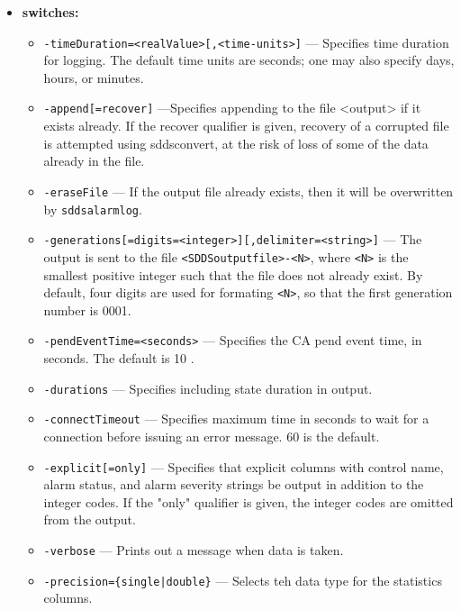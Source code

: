 \begin{itemize}
%
\item {\bf switches:}
%
%
    \begin{itemize}
%
%
        \item {\tt -timeDuration=<realValue>[,<time-units>]} ---  Specifies time duration for logging.
                The default time units are seconds; one may also specify days, hours, or minutes.
        \item {\tt -append[=recover]} ---Specifies appending to the file <output> if it exists already.
                If the recover qualifier is given, recovery of a corrupted file
                is attempted using sddsconvert, at the risk of loss of some of the
                data already in the file.
        \item {\tt -eraseFile} --- If the output file already exists, then it will be overwritten
                by \verb+sddsalarmlog+.
        \item {\verb+-generations[=digits=<integer>][,delimiter=<string>]+} ---
                The output is sent to the file \verb+<SDDSoutputfile>-<N>+, where \verb+<N>+ is
                   the smallest positive integer such that the file does not already
                   exist.   By default, four digits are used for formating \verb+<N>+, so that
                   the first generation number is 0001.
        \item {\tt -pendEventTime=<seconds>} --- Specifies the CA pend event time, in seconds.
                The default is 10 .
        \item {\tt -durations} --- Specifies including state duration in output.
        \item {\tt -connectTimeout} --- Specifies maximum time in seconds to wait for a connection before
                issuing an error message. 60 is the default.
        \item {\tt -explicit[=only]} ---  Specifies that explicit columns with control name, alarm status,
                and alarm severity strings be output in addition to the integer
                codes.  If the "only" qualifier is given, the integer codes are
                omitted from the output.
        \item {\tt -verbose} --- Prints out a message when data is taken.
        \item {\tt -precision=\{single|double\}} --- Selects teh data type for the statistics columns.

\end{itemize}
\end{itemize}
